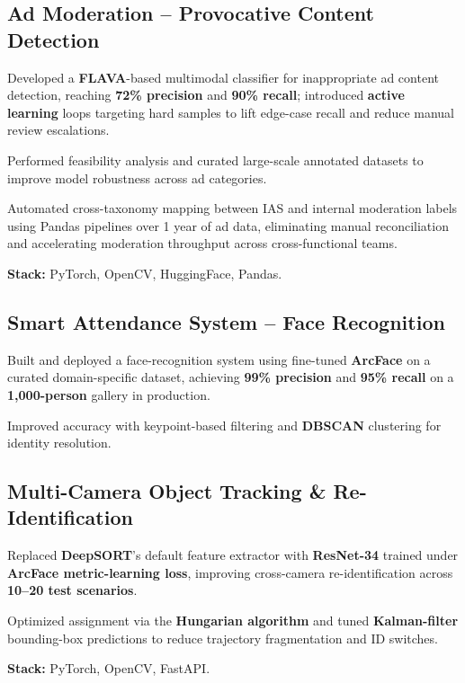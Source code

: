 \documentclass[letter,10pt]{article}
\begin{document}
\subsection{Ad Moderation -- Provocative Content Detection}
\begin{zitemize}
\item Developed a \textbf{FLAVA}-based multimodal classifier for inappropriate ad content detection, reaching \textbf{72\% precision} and \textbf{90\% recall}; introduced \textbf{active learning} loops targeting hard samples to lift edge-case recall and reduce manual review escalations.
\item Performed feasibility analysis and curated large-scale annotated datasets to improve model robustness across ad categories.
\item Automated cross-taxonomy mapping between IAS and internal moderation labels using Pandas pipelines over 1 year of ad data, eliminating manual reconciliation and accelerating moderation throughput across cross-functional teams.
\item \textbf{Stack:} PyTorch, OpenCV, HuggingFace, Pandas.
\end{zitemize}

\subsection{Smart Attendance System -- Face Recognition}
\begin{zitemize}
\item Built and deployed a face-recognition system using fine-tuned \textbf{ArcFace} on a curated domain-specific dataset, achieving \textbf{99\% precision} and \textbf{95\% recall} on a \textbf{1{,}000-person} gallery in production.
\item Improved accuracy with keypoint-based filtering and \textbf{DBSCAN} clustering for identity resolution.
\end{zitemize}

\subsection{Multi-Camera Object Tracking \& Re-Identification}
\begin{zitemize}
\item Replaced \textbf{DeepSORT}'s default feature extractor with \textbf{ResNet-34} trained under \textbf{ArcFace metric-learning loss}, improving cross-camera re-identification across \textbf{10--20 test scenarios}.
\item Optimized assignment via the \textbf{Hungarian algorithm} and tuned \textbf{Kalman-filter} bounding-box predictions to reduce trajectory fragmentation and ID switches.
\item \textbf{Stack:} PyTorch, OpenCV, FastAPI.
\end{zitemize}
\end{document}
